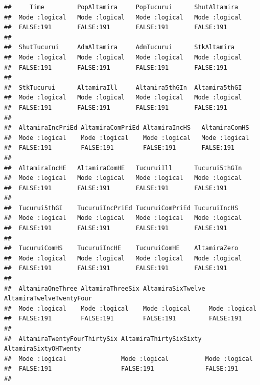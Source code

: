 \documentclass[
]{article}
\begin{document}
\begin{verbatim}
##     Time         PopAltamira     PopTucurui      ShutAltamira   
##  Mode :logical   Mode :logical   Mode :logical   Mode :logical  
##  FALSE:191       FALSE:191       FALSE:191       FALSE:191      
##                                                                 
##  ShutTucurui     AdmAltamira     AdmTucurui      StkAltamira    
##  Mode :logical   Mode :logical   Mode :logical   Mode :logical  
##  FALSE:191       FALSE:191       FALSE:191       FALSE:191      
##                                                                 
##  StkTucurui      AltamiraIll     Altamira5thGIn  Altamira5thGI  
##  Mode :logical   Mode :logical   Mode :logical   Mode :logical  
##  FALSE:191       FALSE:191       FALSE:191       FALSE:191      
##                                                                 
##  AltamiraIncPriEd AltamiraComPriEd AltamiraIncHS   AltamiraComHS  
##  Mode :logical    Mode :logical    Mode :logical   Mode :logical  
##  FALSE:191        FALSE:191        FALSE:191       FALSE:191      
##                                                                   
##  AltamiraIncHE   AltamiraComHE   TucuruiIll      Tucurui5thGIn  
##  Mode :logical   Mode :logical   Mode :logical   Mode :logical  
##  FALSE:191       FALSE:191       FALSE:191       FALSE:191      
##                                                                 
##  Tucurui5thGI    TucuruiIncPriEd TucuruiComPriEd TucuruiIncHS   
##  Mode :logical   Mode :logical   Mode :logical   Mode :logical  
##  FALSE:191       FALSE:191       FALSE:191       FALSE:191      
##                                                                 
##  TucuruiComHS    TucuruiIncHE    TucuruiComHE    AltamiraZero   
##  Mode :logical   Mode :logical   Mode :logical   Mode :logical  
##  FALSE:191       FALSE:191       FALSE:191       FALSE:191      
##                                                                 
##  AltamiraOneThree AltamiraThreeSix AltamiraSixTwelve AltamiraTwelveTwentyFour
##  Mode :logical    Mode :logical    Mode :logical     Mode :logical           
##  FALSE:191        FALSE:191        FALSE:191         FALSE:191               
##                                                                              
##  AltamiraTwentyFourThirtySix AltamiraThirtySixSixty AltamiraSixtyOHTwenty
##  Mode :logical               Mode :logical          Mode :logical        
##  FALSE:191                   FALSE:191              FALSE:191            
##                                                                          

\end{verbatim}
\end{document}

